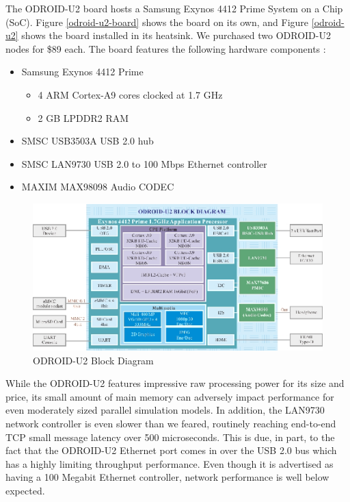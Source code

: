 \documentclass[11pt]{book}
\begin{document}
The ODROID-U2 board hosts a Samsung Exynos 4412 Prime System on a Chip (SoC).  Figure
\ref{odroid-u2-board} shows the board on its own, and Figure \ref{odroid-u2} shows the
board installed in its heatsink.  We purchased two ODROID-U2 nodes for \$89 each.  The
board features the following hardware components \cite{odroid-u2-board-detail}:

\begin{itemize}
\item Samsung Exynos 4412 Prime
  \begin{itemize}
  \item 4 ARM Cortex-A9 cores clocked at 1.7 GHz
  \item 2 GB LPDDR2 RAM
  \end{itemize}
\item SMSC USB3503A USB 2.0 hub
\item SMSC LAN9730 USB 2.0 to 100 Mbps Ethernet controller
\item MAXIM MAX98098 Audio CODEC
\end{itemize}

\begin{figure}
\centering
\includegraphics[width=\textwidth]{odroid_u2_block_diagram}
\caption{ODROID-U2 Block Diagram \cite{odroid-u2-board-detail}}
\label{odroid-u2-block-diagram}
\end{figure}

While the ODROID-U2 features impressive raw processing power for its size and price, its
small amount of main memory can adversely impact performance for even moderately sized
parallel simulation models.  In addition, the LAN9730 network controller is even slower
than we feared, routinely reaching end-to-end TCP small message latency over 500
microseconds.  This is due, in part, to the fact that the ODROID-U2 Ethernet port comes in
over the USB 2.0 bus which has a highly limiting throughput performance.  Even though it
is advertised as having a 100 Megabit Ethernet controller, network performance is well below
expected. %
\end{document}
